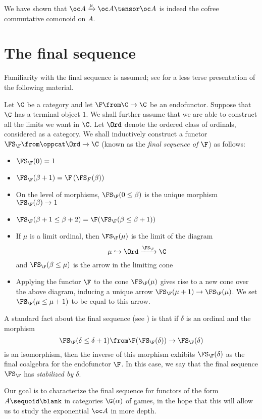\documentclass[11pt]{article} %
\begin{document}
We have shown that $\oc A \xrightarrow{\mu}\oc A \tensor \oc A$ is indeed the cofree commutative comonoid on $A$.  

\section{The final sequence}

Familiarity with the final sequence is assumed; see \cite{finalseq} for a less terse presentation of the following material.

Let $\C$ be a category and let $\F\from \C\to \C$ be an endofunctor.  Suppose that $\C$ has a terminal object $1$.  We shall further assume that we are able to construct all the limits we want in $\C$.  Let $\Ord$ denote the ordered class of ordinals, considered as a category.  We shall inductively construct a functor $\FS_\F\from\oppcat\Ord\to\C$ (known as the \emph{final sequence of $\F$}) as follows:

\begin{itemize}
  \item $\FS_\F(0)=1$
  \item $\FS_\F(\beta+1) =\F\left(\FS_F(\beta)\right)$
  \item On the level of morphisms, $\FS_\F(0\le\beta)$ is the unique morphism $\FS_\F(\beta)\to 1$
  \item $\FS_\F(\beta+1\le\beta+2)=\F(\FS_\F(\beta\le\beta+1))$
  \item If $\mu$ is a limit ordinal, then $\FS_\F(\mu)$ is the limit of the diagram
    \[
      \mu\hookrightarrow\Ord\xrightarrow{\FS_\F}\C
      \]
    and $\FS_\F(\beta\le\mu)$ is the arrow in the limiting cone
  \item Applying the functor $\F$ to the cone $\FS_\F(\mu)$ gives rise to a new cone over the above diagram, inducing a unique arrow $\FS_\F(\mu+1)\to\FS_\F(\mu)$.  We set $\FS_\F(\mu\le\mu+1)$ to be equal to this arrow.
\end{itemize}

A standard fact about the final sequence (see \cite{finalseq}) is that if $\delta$ is an ordinal and the morphism
\[
  \FS_\F(\delta\le\delta+1)\from \F(\FS_\F(\delta))\to \FS_\F(\delta)
  \]
is an isomorphism, then the inverse of this morphism exhibits $\FS_\F(\delta)$ as the final coalgebra for the endofunctor $\F$.  In this case, we say that the final sequence $\FS_\F$ has \emph{stabilized by $\delta$}.  

Our goal is to characterize the final sequence for functors of the form $A\sequoid\blank$ in categories $\G(\alpha)$ of games, in the hope that this will allow us to study the exponential $\oc A$ in more depth.
\end{document}
